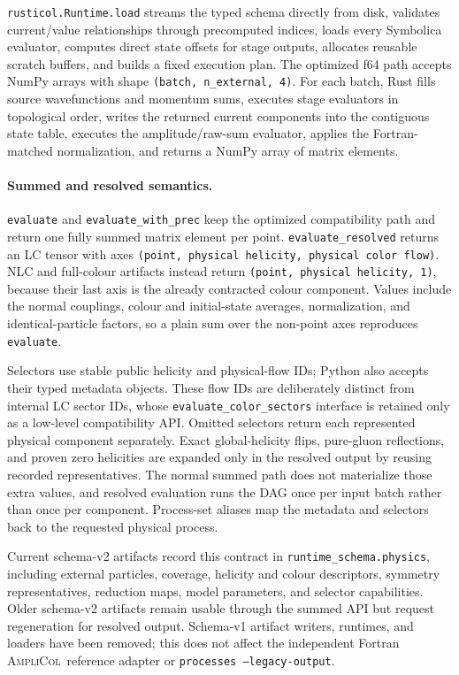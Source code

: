 \documentclass[10pt]{article}
\newcommand{\AC}{\textsc{AmpliCol}}
\begin{document}
\texttt{rusticol.Runtime.load} streams the typed schema directly from disk,
validates current/value relationships through precomputed indices, loads every
Symbolica evaluator, computes direct state offsets for stage outputs, allocates
reusable scratch buffers, and builds a fixed execution plan.  The optimized f64
path accepts NumPy arrays with shape
\texttt{(batch, n\_external, 4)}.  For each batch, Rust fills source
wavefunctions and momentum sums, executes stage evaluators in topological order,
writes the returned current components into the contiguous state table, executes
the amplitude/raw-sum evaluator, applies the Fortran-matched normalization, and
returns a NumPy array of matrix elements.

\paragraph{Summed and resolved semantics.}
\texttt{evaluate} and \texttt{evaluate\_with\_prec} keep the optimized
compatibility path and return one fully summed matrix element per point.
\texttt{evaluate\_resolved} returns an LC tensor with axes
\texttt{(point, physical helicity, physical color flow)}.  NLC and full-colour
artifacts instead return
\texttt{(point, physical helicity, 1)}, because their last axis is the already
contracted colour component.  Values include the normal couplings, colour and
initial-state averages, normalization, and identical-particle factors, so a
plain sum over the non-point axes reproduces \texttt{evaluate}.

Selectors use stable public helicity and physical-flow IDs; Python also accepts
their typed metadata objects.  These flow IDs are deliberately distinct from
internal LC sector IDs, whose \texttt{evaluate\_color\_sectors} interface is
retained only as a low-level compatibility API.  Omitted selectors return each
represented physical component separately.  Exact global-helicity flips,
pure-gluon reflections, and proven zero helicities are expanded only in the
resolved output by reusing recorded representatives.  The normal summed path
does not materialize those extra values, and resolved evaluation runs the DAG
once per input batch rather than once per component.  Process-set aliases map
the metadata and selectors back to the requested physical process.

Current schema-v2 artifacts record this contract in
\texttt{runtime\_schema.physics}, including external particles, coverage,
helicity and colour descriptors, symmetry representatives, reduction maps,
model parameters, and selector capabilities.  Older schema-v2 artifacts remain
usable through the summed API but request regeneration for resolved output.
Schema-v1 artifact writers, runtimes, and loaders have been removed; this does
not affect the independent Fortran \AC\ reference adapter or
\texttt{processes --legacy-output}.
\end{document}
